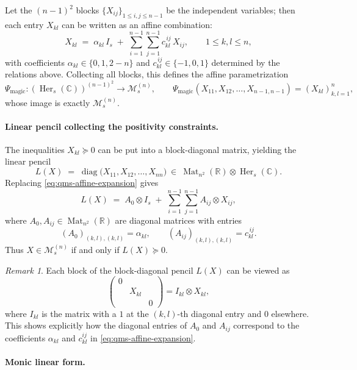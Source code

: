 \documentclass[11pt, a4paper]{article}
\theoremstyle{plain}
\theoremstyle{definition}
\theoremstyle{remark}
\newtheorem{remark}[theorem]{Remark}
\newcommand{\R}{\mathbb{R}}
\newcommand{\C}{\mathbb{C}}
\newcommand{\cMn}{\mathcal{M}^{(n)}}
\newcommand{\Her}[2][\C]{\operatorname{Her}_{#2}(#1)}
\newcommand{\Mat}[2]{\operatorname{Mat}_{#2}\!\left(#1\right)}
\begin{document}
Let the \((n-1)^2\) blocks \(\{X_{ij}\}_{1\le i,j\le n-1}\) be the independent variables; then each entry \(X_{kl}\) can be written as an affine combination:
\begin{equation}\label{eq:qms-affine-expansion}
X_{kl}\;=\;\alpha_{kl}\,I_s\;+\;\sum_{i=1}^{n-1}\sum_{j=1}^{n-1} c_{kl}^{\,ij}\,X_{ij},
\qquad 1\le k,l\le n,
\end{equation}
with coefficients \(\alpha_{kl}\in\{0,1,2-n\}\) and \(c_{kl}^{\,ij}\in\{-1,0,1\}\) determined by the relations above.
Collecting all blocks, this defines the affine parametrization
\[
\Psi_{\mathrm{magic}} : (\Her{s})^{(n-1)^2} \to \cMn_s,\qquad
\Psi_{\mathrm{magic}}(X_{11},X_{12},\dots,X_{n-1,n-1}) = (X_{kl})_{k,l=1}^n,
\]
whose image is exactly \(\cMn_s\).

\paragraph{Linear pencil collecting the positivity constraints.}

The inequalities \(X_{kl}\succeq 0\) can be put into a block-diagonal matrix, yielding the linear pencil
\[
L(X)\;=\;\operatorname{diag}\bigl(X_{11},X_{12},\dots,X_{nn}\bigr)\ \in\ \Mat{\R}{n^2}\otimes\Her{s}.
\]
Replacing \eqref{eq:qms-affine-expansion} gives
\begin{equation}\label{eq:qms-pencil}
L(X)\;=\;A_0\otimes I_s\;+\;\sum_{i=1}^{n-1}\sum_{j=1}^{n-1} A_{ij}\otimes X_{ij},
\end{equation}
where \(A_0, A_{ij}\in \Mat{\R}{n^2}\) are diagonal matrices with entries
\[
(A_0)_{(k,l),(k,l)}=\alpha_{kl},\qquad
(A_{ij})_{(k,l),(k,l)}=c_{kl}^{\,ij}.
\]
Thus \(X\in \cMn_s\) if and only if \(L(X)\succeq 0\).

\begin{remark}
Each block of the block-diagonal pencil \(L(X)\) can be viewed as
\[
\begin{pmatrix}
0 & & \\
& X_{kl} & \\
& & 0
\end{pmatrix} 
= I_{kl} \otimes X_{kl},
\]
where \(I_{kl}\) is the matrix with a \(1\) at the \((k,l)\)-th diagonal entry and \(0\) elsewhere. 
This shows explicitly how the diagonal entries of \(A_0\) and \(A_{ij}\) correspond to the coefficients \(\alpha_{kl}\) and \(c_{kl}^{ij}\) in \eqref{eq:qms-affine-expansion}.
\end{remark}

\paragraph{Monic linear form.}
\end{document}
